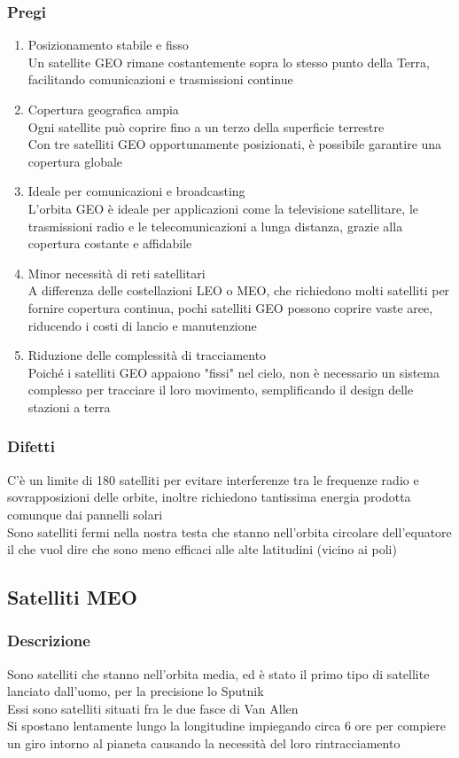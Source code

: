 \documentclass[10pt,oneside,a4paper]{article}
\begin{document}
\subsubsection{Pregi}
\begin{enumerate}
\item Posizionamento stabile e fisso\\
Un satellite GEO rimane costantemente sopra lo stesso punto della Terra, facilitando comunicazioni e trasmissioni continue
\item Copertura geografica ampia\\
Ogni satellite può coprire fino a un terzo della superficie terrestre\\
Con tre satelliti GEO opportunamente posizionati, è possibile garantire una copertura globale 
\item Ideale per comunicazioni e broadcasting\\
L'orbita GEO è ideale per applicazioni come la televisione satellitare, le trasmissioni radio e le telecomunicazioni a lunga distanza, grazie alla copertura costante e affidabile
\item Minor necessità di reti satellitari\\
A differenza delle costellazioni LEO o MEO, che richiedono molti satelliti per fornire copertura continua, pochi satelliti GEO possono coprire vaste aree, riducendo i costi di lancio e manutenzione
\item Riduzione delle complessità di tracciamento\\
Poiché i satelliti GEO appaiono "fissi" nel cielo, non è necessario un sistema complesso per tracciare il loro movimento, semplificando il design delle stazioni a terra
\end{enumerate}
\subsubsection{Difetti}
C'è un limite di 180 satelliti per evitare interferenze tra le frequenze radio e sovrapposizioni delle orbite, inoltre richiedono tantissima energia prodotta comunque dai pannelli solari\\
Sono satelliti fermi nella nostra testa che stanno nell'orbita circolare dell'equatore il che vuol dire che sono meno efficaci alle alte latitudini (vicino ai poli)
\subsection{Satelliti MEO}
\subsubsection{Descrizione}
Sono satelliti che stanno nell'orbita media, ed è stato il primo tipo di satellite lanciato dall'uomo, per la precisione lo Sputnik\\
Essi sono satelliti situati fra le due fasce di Van Allen\\
Si spostano lentamente lungo la longitudine impiegando circa 6 ore per compiere un giro intorno al pianeta causando la necessità del loro rintracciamento
\end{document}
